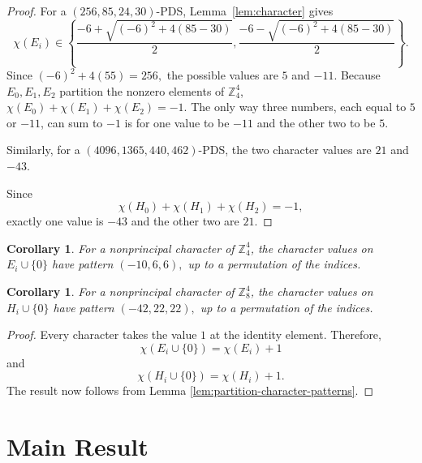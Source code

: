 \documentclass[11pt]{article}
\newtheorem{corollary}[theorem]{Corollary}
\theoremstyle{definition}
\theoremstyle{remark}
\newcommand{\Z}{\mathbb{Z}}
\begin{document}
\begin{proof}
For a \((256,85,24,30)\)-PDS, Lemma~\ref{lem:character}
gives
\[
\chi(E_i)\in
\left\{
\frac{-6+\sqrt{(-6)^2+4(85-30)}}{2},
\frac{-6-\sqrt{(-6)^2+4(85-30)}}{2}
\right\}.
\]
Since $(-6)^2+4(55)=256,$ the possible values are $5$ and $-11$. Because \(E_0,E_1,E_2\) partition the nonzero elements of \(\Z_4^4\), $\chi(E_0)+\chi(E_1)+\chi(E_2)=-1.$
The only way three numbers, each equal to \(5\) or \(-11\), can sum to \(-1\) is for one value to be \(-11\) and the other two to be
\(5\).

Similarly, for a \((4096,1365,440,462)\)-PDS, the two character values are $21$ and $-43$.

Since
\[
\chi(H_0)+\chi(H_1)+\chi(H_2)=-1,
\]
exactly one value is \(-43\) and the other two are \(21\).
\end{proof}

\begin{corollary}
\label{cor:adjoined-zero-patterns}
For a nonprincipal character of \(\Z_4^4\), the character values on $E_i\cup\{0\}$
have pattern $(-10,6,6),$ up to a permutation of the indices. 
\end{corollary}

\begin{corollary}
    For a nonprincipal character of \(\Z_8^4\), the character values on $H_i\cup\{0\}$
have pattern $(-42,22,22),$ up to a permutation of the indices.
\end{corollary}

\begin{proof}
Every character takes the value \(1\) at the identity element.
Therefore,
\[
\chi(E_i\cup\{0\})=\chi(E_i)+1
\]
and
\[
\chi(H_i\cup\{0\})=\chi(H_i)+1.
\]
The result now follows from Lemma
\ref{lem:partition-character-patterns}.
\end{proof}


\section{Main Result}
\label{sec:mainproof}
\end{document}
